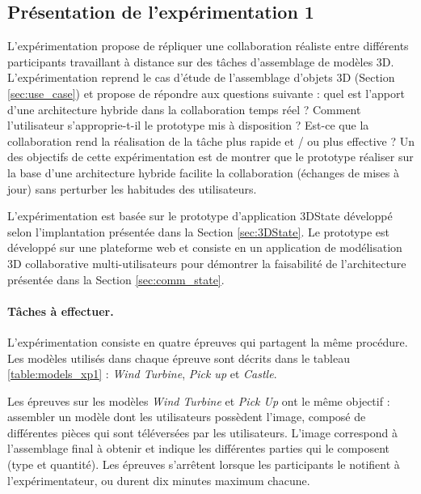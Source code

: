 
\subsection{Présentation de l'expérimentation 1}

L'expérimentation propose de répliquer une collaboration réaliste entre 
différents participants travaillant à distance sur des tâches d'assemblage de 
modèles \gls{3D}. L'expérimentation reprend le cas d'étude de l'assemblage 
d'objets \gls{3D} (Section \ref{sec:use_case}) et propose de répondre aux 
questions suivante : quel est l'apport d'une architecture hybride dans la 
collaboration temps réel ? Comment l'utilisateur s'approprie-t-il le prototype mis à 
disposition ? Est-ce que la collaboration rend la réalisation de la tâche plus rapide 
et / ou plus effective ? Un des objectifs de cette expérimentation est de montrer 
que le prototype réaliser sur la base d'une architecture hybride facilite la 
collaboration (échanges de mises à jour) sans perturber les habitudes des 
utilisateurs.

L'expérimentation est basée sur le prototype d'application 3DState développé 
selon l'implantation présentée dans la Section \ref{sec:3DState}.
Le prototype est développé sur une plateforme web et consiste en un application 
de modélisation \gls{3D} collaborative multi-utilisateurs pour démontrer la 
faisabilité de l'architecture présentée dans la Section \ref{sec:comm_state}. 


\paragraph{Tâches à effectuer.}
L'expérimentation consiste en quatre épreuves qui partagent la même procédure.
Les modèles utilisés dans chaque épreuve sont décrits dans le tableau 
\ref{table:models_xp1} : \textit{Wind Turbine}, \textit{Pick up} et \textit{Castle}. 

Les épreuves sur les modèles \textit{Wind Turbine} et \textit{Pick Up} ont le 
même objectif : 
assembler un modèle dont les utilisateurs possèdent l'image, composé de 
différentes pièces qui sont téléversées par les utilisateurs. L'image correspond à 
l'assemblage final à obtenir et indique les différentes parties qui le 
composent (type et quantité). Les épreuves s'arrêtent lorsque les participants 
le notifient à l'expérimentateur, ou durent dix minutes maximum chacune.

